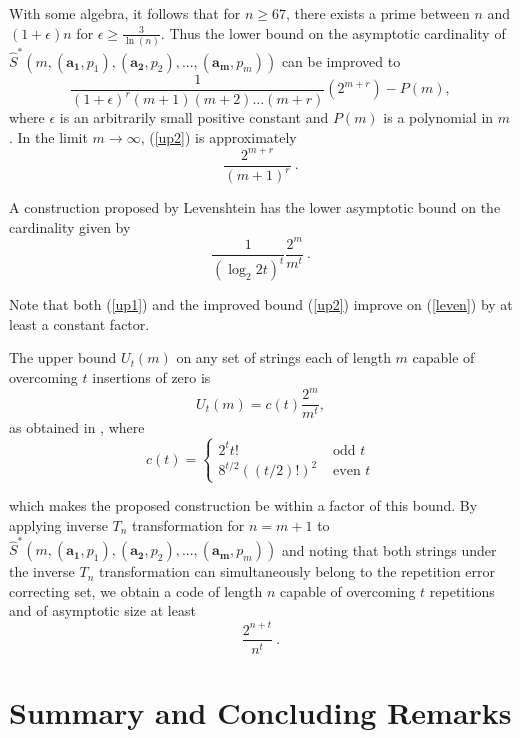 With some algebra, it follows that for $n \geq 67$, there exists a
prime between $n$ and $(1+\epsilon)n$ for $\epsilon \geq
\frac{3}{\ln(n)}$. Thus the lower bound on the asymptotic
cardinality of
$\hat{S}^*\left(m,(\mathbf{a_1},p_1),(\mathbf{a_2},p_2),...,(\mathbf{a_m},p_m)\right)$
can be improved to
\begin{equation}\label{up2}\frac{1}{(1+\epsilon)^r(m+1)(m+2)\dots(m+r)}
                           \left(2^{m+r}\right)-P(m),\end{equation}
\noindent where $\epsilon$ is an arbitrarily small positive
constant and $P(m)$ is a polynomial in $m$. In the limit $m
\rightarrow \infty$, (\ref{up2}) is approximately
\begin{equation}\frac{2^{m+r}}{(m+1)^r}~.\end{equation}





A construction proposed by Levenshtein \cite{lev:66a} has the
lower asymptotic bound on the cardinality given by
\begin{equation}\label{leven}
\frac{1}{(\log_2 2t)^t}\frac{2^m}{m^t}~.
\end{equation}

Note that both (\ref{up1}) and the improved bound (\ref{up2})
improve on (\ref{leven}) by at least a constant factor.

The upper bound $U_t(m)$ on any set of strings each of length $m$
capable of overcoming $t$ insertions of zero is \[U_t(m)=c(t)
\frac{2^m}{m^t},\] as obtained in \cite{lev:66a}, where \[ c(t)
=\left\{
\begin{array}{lll} 2^t t! &
\text{ odd } t\\
8^{t/2}((t/2)!)^2&\text{ even } t\end{array} \right. \]

which makes the proposed construction be within a factor of this
bound. By applying inverse $T_n$ transformation for $n=m+1$ to
$\hat{S}^*\left(m,(\mathbf{a_1},p_1),(\mathbf{a_2},p_2),...,(\mathbf{a_m},p_m)\right)$
and noting that both strings under the inverse $T_n$
transformation can simultaneously belong to the repetition error
correcting set, we obtain a code of length $n$ capable of
overcoming $t$ repetitions and of asymptotic size at least
\begin{equation}\frac{2^{n+t}}{n^t}~.\end{equation}

\section{Summary and Concluding Remarks}

